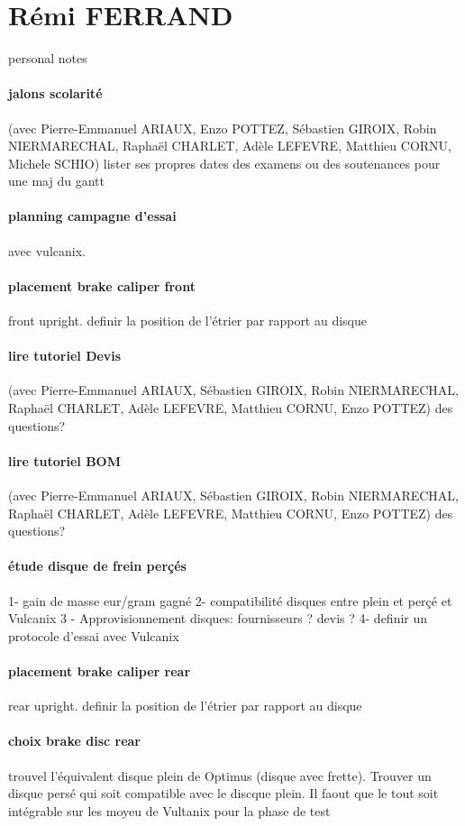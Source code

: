 
 
 \newpage \section*{Rémi FERRAND} 
 \par personal notes
\paragraph{jalons scolarité} (avec Pierre-Emmanuel ARIAUX, Enzo POTTEZ, Sébastien GIROIX, Robin NIERMARECHAL, Raphaël CHARLET, Adèle LEFEVRE, Matthieu CORNU, Michele SCHIO) lister ses propres dates des examens ou des soutenances pour une maj du gantt
\paragraph{planning campagne d'essai} avec vulcanix.
\paragraph{placement brake caliper front} front upright. definir la position de l'étrier par rapport au disque
\paragraph{lire tutoriel Devis} (avec Pierre-Emmanuel ARIAUX, Sébastien GIROIX, Robin NIERMARECHAL, Raphaël CHARLET, Adèle LEFEVRE, Matthieu CORNU, Enzo POTTEZ) des questions?
\paragraph{lire tutoriel BOM} (avec Pierre-Emmanuel ARIAUX, Sébastien GIROIX, Robin NIERMARECHAL, Raphaël CHARLET, Adèle LEFEVRE, Matthieu CORNU, Enzo POTTEZ) des questions?
\paragraph{étude disque de frein perçés} 1- gain de masse eur/gram gagné
2- compatibilité disques entre plein et perçé et Vulcanix
3 - Approvisionnement disques: fournisseurs ? devis ?
4- definir un protocole d'essai avec Vulcanix

\paragraph{placement brake caliper rear} rear upright. definir la position de l'étrier par rapport au disque
\paragraph{choix brake disc rear} trouvel l'équivalent disque plein de Optimus (disque avec frette). Trouver un disque persé qui soit compatible avec le discque plein. Il faout que le tout soit intégrable sur les moyeu de Vultanix pour la phase de test
